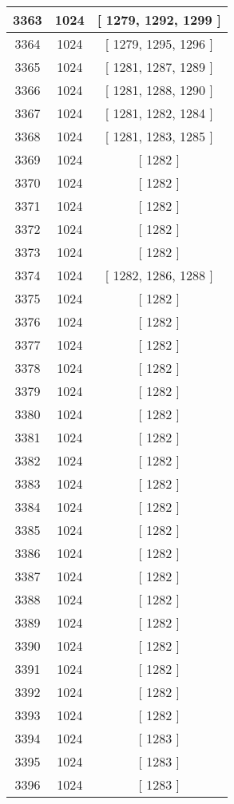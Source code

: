 \begin{center}
\begin{longtable}[H]{|| c c c ||}
\hline
3363 & 1024 & [ 1279, 1292, 1299 ] \\ 
\hline
3364 & 1024 & [ 1279, 1295, 1296 ] \\ 
\hline
3365 & 1024 & [ 1281, 1287, 1289 ] \\ 
\hline
3366 & 1024 & [ 1281, 1288, 1290 ] \\ 
\hline
3367 & 1024 & [ 1281, 1282, 1284 ] \\ 
\hline
3368 & 1024 & [ 1281, 1283, 1285 ] \\ 
\hline
3369 & 1024 & [ 1282 ] \\ 
\hline
3370 & 1024 & [ 1282 ] \\ 
\hline
3371 & 1024 & [ 1282 ] \\ 
\hline
3372 & 1024 & [ 1282 ] \\ 
\hline
3373 & 1024 & [ 1282 ] \\ 
\hline
3374 & 1024 & [ 1282, 1286, 1288 ] \\ 
\hline
3375 & 1024 & [ 1282 ] \\ 
\hline
3376 & 1024 & [ 1282 ] \\ 
\hline
3377 & 1024 & [ 1282 ] \\ 
\hline
3378 & 1024 & [ 1282 ] \\ 
\hline
3379 & 1024 & [ 1282 ] \\ 
\hline
3380 & 1024 & [ 1282 ] \\ 
\hline
3381 & 1024 & [ 1282 ] \\ 
\hline
3382 & 1024 & [ 1282 ] \\ 
\hline
3383 & 1024 & [ 1282 ] \\ 
\hline
3384 & 1024 & [ 1282 ] \\ 
\hline
3385 & 1024 & [ 1282 ] \\ 
\hline
3386 & 1024 & [ 1282 ] \\ 
\hline
3387 & 1024 & [ 1282 ] \\ 
\hline
3388 & 1024 & [ 1282 ] \\ 
\hline
3389 & 1024 & [ 1282 ] \\ 
\hline
3390 & 1024 & [ 1282 ] \\ 
\hline
3391 & 1024 & [ 1282 ] \\ 
\hline
3392 & 1024 & [ 1282 ] \\ 
\hline
3393 & 1024 & [ 1282 ] \\ 
\hline
3394 & 1024 & [ 1283 ] \\ 
\hline
3395 & 1024 & [ 1283 ] \\ 
\hline
3396 & 1024 & [ 1283 ] \\ 

\end{longtable}
\end{center}

